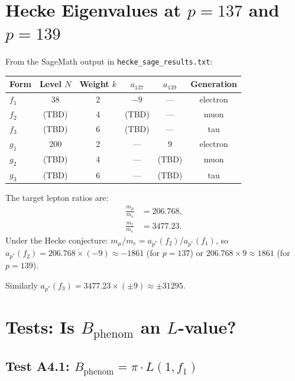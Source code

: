 \documentclass[12pt,a4paper]{article}
\theoremstyle{definition}
\theoremstyle{remark}
\begin{document}
\section{Hecke Eigenvalues at $p = 137$ and $p = 139$}
\label{sec:hecke_eigenvalues}

From the SageMath output in \texttt{hecke\_sage\_results.txt}:

\begin{center}
\begin{tabular}{lccccc}
  \toprule
  Form & Level $N$ & Weight $k$ & $a_{137}$ & $a_{139}$ & Generation \\
  \midrule
  $f_1$ & 38 & 2 & $-9$ & --- & electron \\
  $f_2$ & (TBD) & 4 & (TBD) & --- & muon \\
  $f_3$ & (TBD) & 6 & (TBD) & --- & tau \\
  $g_1$ & 200 & 2 & --- & $9$ & electron \\
  $g_2$ & (TBD) & 4 & --- & (TBD) & muon \\
  $g_3$ & (TBD) & 6 & --- & (TBD) & tau \\
  \bottomrule
\end{tabular}
\end{center}

The target lepton ratios are:
\begin{align}
  \frac{m_\mu}{m_e} &= 206.768, \\
  \frac{m_\tau}{m_e} &= 3477.23.
\end{align}
Under the Hecke conjecture: $m_\mu/m_e = a_{p^*}(f_2)/a_{p^*}(f_1)$,
so $a_{p^*}(f_2) = 206.768 \times (-9) \approx -1861$ (for $p = 137$)
or $206.768 \times 9 \approx 1861$ (for $p = 139$).

Similarly $a_{p^*}(f_3) = 3477.23 \times (\pm 9) \approx \pm 31295$.

\section{Tests: Is $B_{\mathrm{phenom}}$ an $L$-value?}
\label{sec:tests}

\subsection{Test A4.1: $B_{\mathrm{phenom}} = \pi \cdot L(1, f_1)$}
\end{document}
